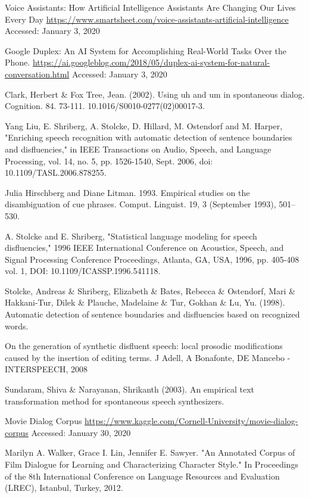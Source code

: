 \documentclass[journal]{IEEEtran}
\begin{document}
\begin{thebibliography}{99}
 Voice Assistants: How Artificial Intelligence Assistants Are Changing Our Lives Every Day
\url{https://www.smartsheet.com/voice-assistants-artificial-intelligence} Accessed: January 3, 2020

 Google Duplex: An AI System for Accomplishing Real-World Tasks Over the Phone. \url{https://ai.googleblog.com/2018/05/duplex-ai-system-for-natural-conversation.html} Accessed: January 3, 2020

 Clark, Herbert \& Fox Tree, Jean. (2002). Using uh and um in spontaneous dialog. Cognition. 84. 73-111. 10.1016/S0010-0277(02)00017-3.

 Yang Liu, E. Shriberg, A. Stolcke, D. Hillard, M. Ostendorf and M. Harper, "Enriching speech recognition with automatic detection of sentence boundaries and disfluencies," in IEEE Transactions on Audio, Speech, and Language Processing, vol. 14, no. 5, pp. 1526-1540, Sept. 2006, doi: 10.1109/TASL.2006.878255.

 Julia Hirschberg and Diane Litman. 1993. Empirical studies on the disambiguation of cue phrases. Comput. Linguist. 19, 3 (September 1993), 501–530.

 A. Stolcke and E. Shriberg, "Statistical language modeling for speech disfluencies," 1996 IEEE International Conference on Acoustics, Speech, and Signal Processing Conference Proceedings, Atlanta, GA, USA, 1996, pp. 405-408 vol. 1, DOI: 10.1109/ICASSP.1996.541118.

 Stolcke, Andreas \& Shriberg, Elizabeth \& Bates, Rebecca \& Ostendorf, Mari \& Hakkani-Tur, Dilek \& Plauche, Madelaine \& Tur, Gokhan \& Lu, Yu. (1998). Automatic detection of sentence boundaries and disfluencies based on recognized words. 

 On the generation of synthetic disfluent speech: local prosodic modifications caused by the insertion of editing terms. J Adell, A Bonafonte, DE Mancebo - INTERSPEECH, 2008

 Sundaram, Shiva \& Narayanan, Shrikanth (2003). An empirical text transformation method for spontaneous speech synthesizers.

 Movie Dialog Corpus \url{https://www.kaggle.com/Cornell-University/movie-dialog-corpus} Accessed: January 30, 2020

 Marilyn A. Walker, Grace I. Lin, Jennifer E. Sawyer. "An Annotated Corpus of Film Dialogue for Learning and Characterizing Character Style." In Proceedings of the 8th International Conference on Language Resources and Evaluation (LREC), Istanbul, Turkey, 2012.


\end{thebibliography}
\end{document}
